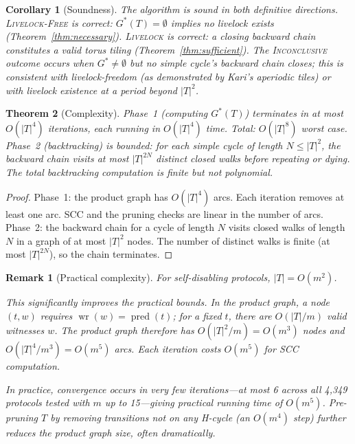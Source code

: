 \documentclass[11pt]{article}
\newtheorem{theorem}{Theorem}
\newtheorem{corollary}[theorem]{Corollary}
\newtheorem{remark}{Remark}
\begin{document}
\begin{corollary}[Soundness]
The algorithm is sound in both definitive directions. \textsc{Livelock-Free} is correct: $G^*(T) = \emptyset$ implies no livelock exists (Theorem~\ref{thm:necessary}). \textsc{Livelock} is correct: a closing backward chain constitutes a valid torus tiling (Theorem~\ref{thm:sufficient}). The \textsc{Inconclusive} outcome occurs when $G^* \neq \emptyset$ but no simple cycle's backward chain closes; this is consistent with livelock-freedom (as demonstrated by Kari's aperiodic tiles) or with livelock existence at a period beyond $|T|^2$.
\end{corollary}

\begin{theorem}[Complexity]
Phase~1 (computing $G^*(T)$) terminates in at most $O(|T|^4)$ iterations, each running in $O(|T|^4)$ time. Total: $O(|T|^8)$ worst case. Phase~2 (backtracking) is bounded: for each simple cycle of length $N \leq |T|^2$, the backward chain visits at most $|T|^{2N}$ distinct closed walks before repeating or dying. The total backtracking computation is finite but not polynomial.
\end{theorem}

\begin{proof}
Phase~1: the product graph has $O(|T|^4)$ arcs. Each iteration removes at least one arc. SCC and the pruning checks are linear in the number of arcs. Phase~2: the backward chain for a cycle of length $N$ visits closed walks of length $N$ in a graph of at most $|T|^2$ nodes. The number of distinct walks is finite (at most $|T|^{2N}$), so the chain terminates.
\end{proof}

\begin{remark}[Practical complexity]
For self-disabling protocols, $|T| = O(m^2)$.

This significantly improves the practical bounds. In the product graph, a node $(t, w)$ requires $\operatorname{wr}(w) = \operatorname{pred}(t)$; for a fixed $t$, there are $O(|T|/m)$ valid witnesses $w$. The product graph therefore has $O(|T|^2/m) = O(m^3)$ nodes and $O(|T|^4/m^3) = O(m^5)$ arcs. Each iteration costs $O(m^5)$ for SCC computation.

In practice, convergence occurs in very few iterations---at most 6 across all 4{,}349 protocols tested with $m$ up to 15---giving practical running time of $O(m^5)$. Pre-pruning $T$ by removing transitions not on any H-cycle (an $O(m^4)$ step) further reduces the product graph size, often dramatically.
\end{remark}
\end{document}
